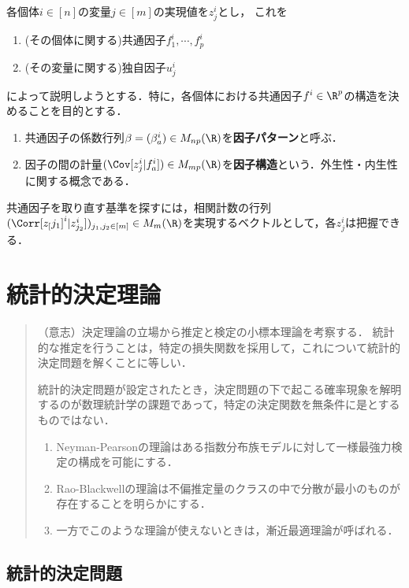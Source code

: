 \documentclass[uplatex,dvipdfmx]{jsreport}
\begin{document}
\begin{model}
    各個体$i\in[n]$の変量$j\in[m]$の実現値を$z_j^i$とし，
    これを
    \begin{enumerate}
        \item (その個体に関する)共通因子$f^i_1,\cdots,f^i_p$
        \item (その変量に関する)独自因子$u^i_j$
    \end{enumerate}
    によって説明しようとする．特に，各個体における共通因子$f^i\in\R^p$の構造を決めることを目的とする．
    \begin{enumerate}
        \item 共通因子の係数行列$\beta=(\beta^i_a)\in M_{np}(\R)$を\textbf{因子パターン}と呼ぶ．
        \item 因子の間の計量$(\Cov[z_j^i|f^i_a])\in M_{mp}(\R)$を\textbf{因子構造}という．外生性・内生性に関する概念である．
    \end{enumerate}
    共通因子を取り直す基準を探すには，相関計数の行列$(\Corr[z_[j_1]^i|z_{j_2}^i])_{j_1,j_2\in[m]}\in M_{m}(\R)$を実現するベクトルとして，各$z_j^i$は把握できる．
\end{model}

\chapter{統計的決定理論}

\begin{quotation}
    （意志）決定理論の立場から推定と検定の小標本理論を考察する．
    統計的な推定を行うことは，特定の損失関数を採用して，これについて統計的決定問題を解くことに等しい．

    統計的決定問題が設定されたとき，決定問題の下で起こる確率現象を解明するのが数理統計学の課題であって，特定の決定関数を無条件に是とするものではない．
    \begin{enumerate}
        \item Neyman-Pearsonの理論はある指数分布族モデルに対して一様最強力検定の構成を可能にする．
        \item Rao-Blackwellの理論は不偏推定量のクラスの中で分散が最小のものが存在することを明らかにする．
        \item 一方でこのような理論が使えないときは，漸近最適理論が呼ばれる．
    \end{enumerate}
\end{quotation}

\section{統計的決定問題}
\end{document}
